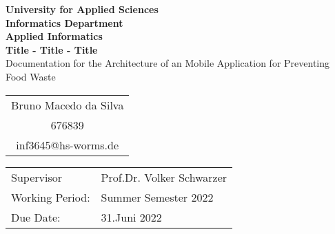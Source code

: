 \begin{titlepage}
    \vspace*{2mm}
    \begin{center}
        \Large
        \textbf{University for Applied Sciences}\\
        \textbf{Informatics Department}\\
        \textbf{Applied Informatics}\\
        \vspace{1cm}
        \textbf{Title - Title - Title}\\
        \vspace{1cm}
        \large
        Documentation for the Architecture of an Mobile Application for Preventing Food Waste\\
        \vspace{4cm}
        \begin {table}[ht]
            \centering
            \begin{tabular}{c}
                Bruno Macedo da Silva    \\ 
                676839                   \\
                inf3645@hs-worms.de      \\
            \end{tabular}
        \end {table}
        \vspace{2cm}
        \large
        \vspace{1cm}
         \begin {table}[ht]
             \centering
             \begin{tabular}{l l}
                Supervisor                & Prof.Dr. Volker Schwarzer \\
                Working Period:   & Summer Semester 2022 \\
                Due Date:            & 31.Juni 2022 \\
             \end{tabular}
         \end {table}
    \end{center}
    \normalsize
    \vfill
 


\end{titlepage}